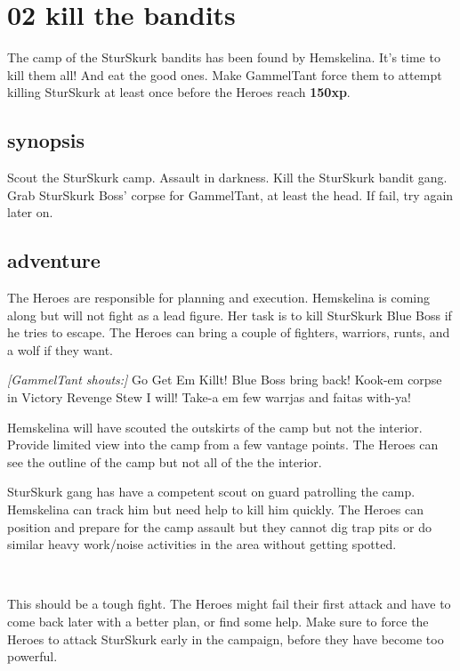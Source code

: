 \section*{02 kill the bandits}
\label{02killthebandits}

The camp of the SturSkurk bandits has been found by Hemskelina. It's time to kill them all! And eat the good ones.
Make GammelTant force them to attempt killing SturSkurk at least once before the Heroes reach \textbf{150xp}.


\subsection*{synopsis}

Scout the SturSkurk camp. Assault in darkness. Kill the SturSkurk bandit gang. Grab SturSkurk Boss' corpse for GammelTant, at least the head. If fail, try again later on.


\subsection*{adventure}

The Heroes are responsible for planning and execution. Hemskelina is coming along but will not fight as a lead figure. Her task is to kill SturSkurk Blue Boss if he tries to escape.
The Heroes can bring a couple of fighters, warriors, runts, and a wolf if they want.

\begin{readoutloud}
\emph{[GammelTant shouts:]}
Go Get Em Killt! Blue Boss bring back! Kook-em corpse in Victory Revenge Stew I will! Take-a em few warrjas and faitas with-ya!
\end{readoutloud}

Hemskelina will have scouted the outskirts of the camp but not the interior. Provide limited view into the camp from a few vantage points. The Heroes can see the outline of the camp but not all of the the interior.

SturSkurk gang has have a competent scout on guard patrolling the camp. Hemskelina can track him but need help to kill him quickly.
The Heroes can position and prepare for the camp assault but they cannot dig trap pits or do similar heavy work/noise activities in the area without getting spotted. 

\

This should be a tough fight. The Heroes might fail their first attack and have to come back later with a better plan, or find some help. Make sure to force the Heroes to attack SturSkurk early in the campaign, before they have become too powerful.


